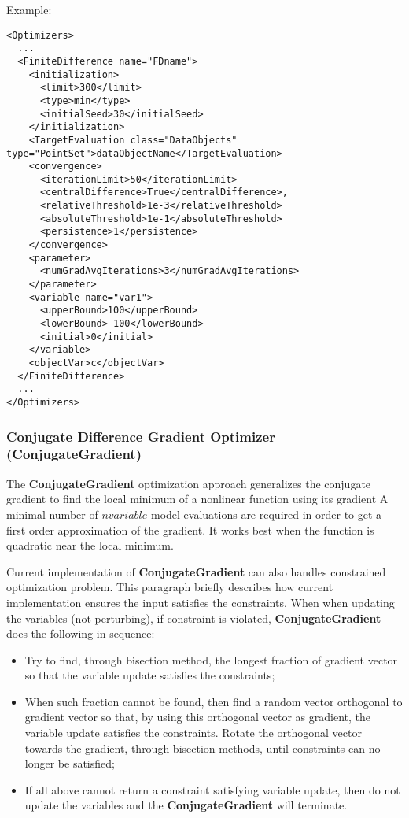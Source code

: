 Example:
\begin{lstlisting}[style=XML]
<Optimizers>
  ...
  <FiniteDifference name="FDname">
    <initialization>
      <limit>300</limit>
      <type>min</type>
      <initialSeed>30</initialSeed>
    </initialization>
    <TargetEvaluation class="DataObjects" type="PointSet">dataObjectName</TargetEvaluation>
    <convergence>
      <iterationLimit>50</iterationLimit>
      <centralDifference>True</centralDifference>,
      <relativeThreshold>1e-3</relativeThreshold>
      <absoluteThreshold>1e-1</absoluteThreshold>
      <persistence>1</persistence>
    </convergence>
    <parameter>
      <numGradAvgIterations>3</numGradAvgIterations>
    </parameter>
    <variable name="var1">
      <upperBound>100</upperBound>
      <lowerBound>-100</lowerBound>
      <initial>0</initial>
    </variable>
    <objectVar>c</objectVar>
  </FiniteDifference>
  ...
</Optimizers>
\end{lstlisting}

\subsubsection{Conjugate Difference Gradient Optimizer (ConjugateGradient)}
\label{subsubsubsec:ConjugateGradient}
The \textbf{ConjugateGradient} optimization approach generalizes the conjugate gradient to find the local minimum
of a nonlinear function using its gradient
A minimal number of $n variable$ model evaluations are required in order to get a first order approximation of the gradient.
It works best when the function is quadratic near the local minimum.

Current implementation of \textbf{ConjugateGradient} can also handles
constrained optimization problem. This paragraph briefly describes how current implementation ensures the input satisfies the
constraints. When when updating the variables (not perturbing), if constraint is violated, \textbf{ConjugateGradient} does the following in
sequence:
\begin{itemize}
\item Try to find, through bisection method, the longest fraction of gradient vector so that the variable update satisfies the
constraints;
\item When such fraction cannot be found, then find a random vector orthogonal to gradient vector so that, by using this
orthogonal vector as gradient, the variable update satisfies the constraints. Rotate the orthogonal vector towards the gradient,
through bisection methods, until constraints can no longer be satisfied;
\item If all above cannot return a constraint satisfying variable update, then do not update the variables and the \textbf{ConjugateGradient} will
terminate.
\end{itemize}


